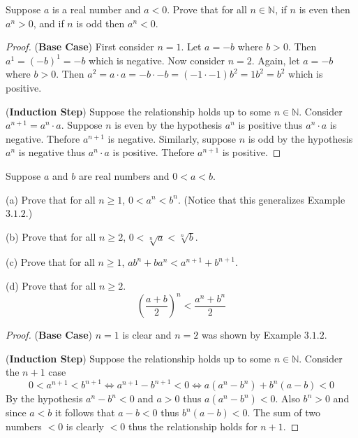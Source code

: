 \begin{tcolorbox}[title=Problem 19, breakable]
    Suppose $a$ is a real number and $a < 0$. Prove that for all $n \in \mathbb{N}$,
    if $n$ is even then $a^n > 0$, and if $n$ is odd then $a^n < 0$.
\end{tcolorbox}

\begin{proof}
    (\textbf{Base Case}) First consider $n = 1$. Let $a = -b$ where $b > 0$.
    Then $a^1 = (-b)^{1} = -b$ which is negative.
    Now consider $n = 2$. Again, let $a = -b$ where $b > 0$.
    Then $a^2 = a \cdot a = -b \cdot -b = (-1 \cdot -1) b^2 = 1 b^2 = b^2$ which is positive.

    (\textbf{Induction Step}) Suppose the relationship holds up to some $n \in \mathbb{N}$.
    Consider $a^{n + 1} = a^n \cdot a$.
    Suppose $n$ is even by the hypothesis $a^n$ is positive thus $a^n \cdot a$ is negative.
    Thefore $a^{n + 1}$ is negative.
    Similarly, suppose $n$ is odd by the hypothesis $a^n$ is negative thus $a^n \cdot a$ is positive.
    Thefore $a^{n + 1}$ is positive.
\end{proof}

\begin{tcolorbox}[title=Problem 20, breakable]
    Suppose $a$ and $b$ are real numbers and $0 < a < b$.

    (a) Prove that for all $n \ge 1$, $0 < a^n < b^n$. (Notice that this 
        generalizes Example $3.1.2.$)

    (b) Prove that for all $n \ge 2$, $0 < \sqrt[n]{a} < \sqrt[n]{b}$.

    (c) Prove that for all $n \ge 1$, $a b^n + b a^n < a^{n + 1} + b^{n + 1}$.

    (d) Prove that for all $n \ge 2$.
    \[\left(\frac{a + b}{2}\right)^n < \frac{a^n + b^n}{2}\]
\end{tcolorbox}

\begin{proof}
    (\textbf{Base Case}) $n = 1$ is clear and $n = 2$ was shown 
        by Example $3.1.2$.
    
    (\textbf{Induction Step}) Suppose the relationship holds up to some $n \in \mathbb{N}$.
    Consider the $n + 1$ case
    \[0 < a^{n + 1} < b^{n + 1} \iff a^{n + 1} - b^{n + 1} < 0 \iff a(a^n - b^n) + b^n(a - b) < 0\]
    By the hypothesis $a^n - b^n < 0$ and $a > 0$ thus $a(a^n - b^n) < 0$.
    Also $b^n > 0$ and since $a < b$ it follows that $a - b < 0$
        thus $b^n(a - b) < 0$.
    The sum of two numbers $< 0$ is clearly $< 0$ thus the relationship holds for $n + 1$.
\end{proof}

